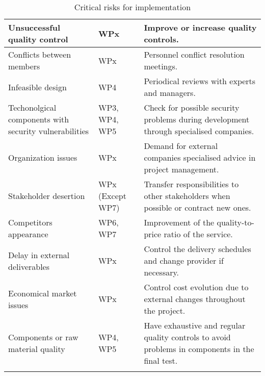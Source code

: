 \begin{longtable}[H]{p{4cm} p{4.7cm} p{5cm}}
 	\midrule

	Unsuccessful quality control & WPx & Improve or increase quality controls. \vspace{0.2cm} \\
 	
 	\midrule

	Conflicts between members  & WPx & Personnel conflict resolution meetings. \vspace{0.2cm} \\
 	
 	\midrule

 	Infeasible design & WP4 & Periodical reviews with experts and managers. \vspace{0.2cm} \\
 	
 	\midrule

	Techonolgical components with security vulnerabilities & WP3, WP4, WP5 & Check for possible security problems during development through specialised companies. \vspace{0.2cm} \\
 	
 	\midrule

	Organization issues & WPx & Demand for external companies specialised advice in project management. \vspace{0.2cm} \\
 	
 	\midrule

	Stakeholder desertion & WPx (Except WP7) & Transfer responsibilities to other stakeholders when possible or contract new ones. \vspace{0.2cm} \\
 	
 	\midrule

	Competitors appearance & WP6, WP7 & Improvement of the quality-to-price ratio of the service. \vspace{0.2cm} \\
 	
 	\midrule

	Delay in external deliverables & WPx & Control the delivery schedules and change provider if necessary. \vspace{0.2cm} \\
 	
 	\midrule

	Economical market issues & WPx & Control cost evolution due to external changes throughout the project. \vspace{0.2cm} \\
 	
 	\midrule

	Components or raw material quality & WP4, WP5 & Have exhaustive and regular quality controls to avoid problems in components in the final test. \vspace{0.2cm} \\
	
	\bottomrule[2pt]
	
	\caption{Critical risks for implementation}
	\label{workpackages}
\end{longtable}

